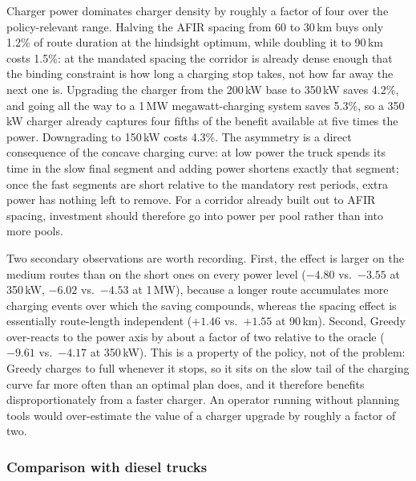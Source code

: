 Charger power dominates charger density by roughly a factor of four over the
policy-relevant range.  Halving the AFIR spacing from 60 to 30\,km buys only
1.2\% of route duration at the hindsight optimum, while doubling it to 90\,km
costs 1.5\%: at the mandated spacing the corridor is already dense enough that
the binding constraint is how long a charging stop takes, not how far away the
next one is.  Upgrading the charger from the 200\,kW base to 350\,kW saves
4.2\%, and going all the way to a 1\,MW megawatt-charging system saves 5.3\%,
so a 350\,kW charger already captures four fifths of the benefit available at
five times the power.  Downgrading to 150\,kW costs 4.3\%.  The asymmetry is a
direct consequence of the concave charging curve: at low power the truck spends
its time in the slow final segment and adding power shortens exactly that
segment; once the fast segments are short relative to the mandatory rest
periods, extra power has nothing left to remove.  For a corridor already built
out to AFIR spacing, investment should therefore go into power per pool rather
than into more pools.

Two secondary observations are worth recording.  First, the effect is larger on
the medium routes than on the short ones on every power level ($-4.80$ vs.\
$-3.55$ at 350\,kW, $-6.02$ vs.\ $-4.53$ at 1\,MW), because a longer route
accumulates more charging events over which the saving compounds, whereas the
spacing effect is essentially route-length independent ($+1.46$ vs.\ $+1.55$ at
90\,km).  Second, Greedy over-reacts to the power axis by about a factor of two
relative to the oracle ($-9.61$ vs.\ $-4.17$ at 350\,kW).  This is a property
of the policy, not of the problem: Greedy charges to full whenever it stops, so
it sits on the slow tail of the charging curve far more often than an optimal
plan does, and it therefore benefits disproportionately from a faster charger.
An operator running without planning tools would over-estimate the value of a
charger upgrade by roughly a factor of two.


\subsubsection{Comparison with diesel trucks}
\label{sec:diesel}

